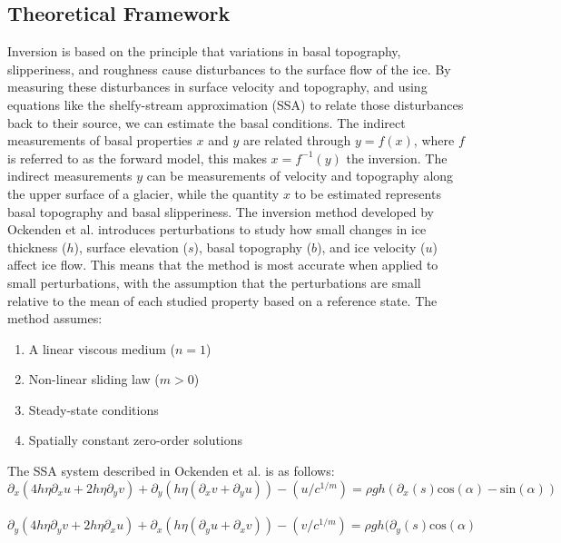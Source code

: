 \subsection*{Theoretical Framework}

Inversion is based on the principle that variations in basal topography, slipperiness, and roughness cause disturbances to the surface flow of the ice. By measuring these disturbances in surface velocity and topography, and using equations like the shelfy-stream approximation (SSA) to relate those disturbances back to their source, we can estimate the basal conditions.
The indirect measurements of basal properties $x$ and $y$ are related through $y=f(x)$, where $f$ is referred to as the forward model, this makes  $x=f^{-1}(y)$ the inversion. The indirect measurements $y$ can be measurements of velocity and topography along the upper surface of a glacier, while the quantity $x$ to be estimated represents basal topography and basal slipperiness\cite{Gudmundsson_2008}.
The inversion method developed by Ockenden et al. introduces perturbations to study how small changes in ice thickness ($h$), surface elevation ($s$), basal topography ($b$), and ice velocity ($u$) affect ice flow. This means that the method is most accurate when applied to small perturbations, with the assumption that the perturbations are small relative to the mean of each studied property based on a reference state. The method assumes:
\begin{enumerate}
\item A linear viscous medium ($n=1$)
\item Non-linear sliding law ($m>0$)
\item Steady-state conditions
\item Spatially constant zero-order solutions
\end{enumerate}

The SSA system described in Ockenden et al.\cite{Ockenden_2022} is as follows:
\begin{equation}\partial_{x} (4 h \eta \partial_{x} u + 2 h \eta \partial_y v) + \partial_{y}(h \eta( \partial_{x} v + \partial_{y} u)) - (u/c^{1/m}) = \rho g h ( \partial_{x} (s) \mathrm{cos}(\alpha) - \mathrm{sin}(\alpha))
\end{equation}\label{eq:2.1}\\
\begin{equation}\partial_{y} (4 h \eta \partial_{y} v + 2 h \eta \partial_x u) + \partial_{x}(h \eta( \partial_{y} u + \partial_{x} v)) - (v/c^{1/m}) = \rho g h ( \partial_{y} (s) \mathrm{cos}(\alpha)
\end{equation}\label{eq:2.2}

